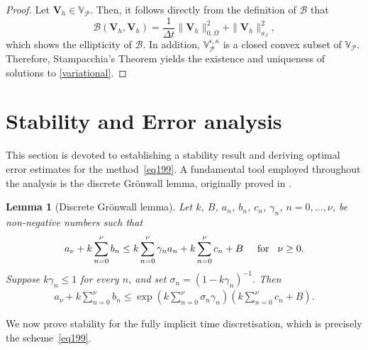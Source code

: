 \documentclass[final,12pt]{amsart}
\theoremstyle{plain}
\newtheorem{lemma}[theorem]{Lemma}
\theoremstyle{definition}
\newcommand\calP{{\mathcal{P}}}
\begin{document}
\begin{proof}
	Let $\mathbf{V}_h\in\mathbb{V}_\calP^{}$. Then, it follows directly from the definition
	of $\mathcal{B}$ that
	\[
	\mathcal{B}(\mathbf{V}_h,\mathbf{V}_h)=\frac{1}{\Delta t}  \|\mathbf{V}_h\|_{0,\Omega}^2
	+\|\mathbf{V}_h\|^2_{a_J} ,
	\] 
	which shows the ellipticity of $\mathcal{B}$.  In addition,  $\mathbb{V}_{\calP}^{\epsilon,\kappa}$ is a closed convex subset of $\mathbb{V}_{\calP}$. Therefore, Stampacchia’s Theorem 
	yields the existence and uniqueness of solutions to \eqref{variational}.
\end{proof}

\section{Stability and Error analysis}\label{Sec:Error}

This section is devoted to establishing a stability result and deriving optimal error estimates for the method~\eqref{eq199}. A fundamental tool employed throughout the analysis is the discrete Gr\"onwall lemma, originally proved in \cite[Lemma~5.1]{heywood1990finite}.

\begin{lemma}[Discrete Gr\"onwall lemma]\label{13}
	Let $k$, $B$, $a_{n}$, $b_{n}$, $c_{n}$, $\gamma_{n}$, $n=0,\ldots,\nu$, be non-negative numbers such that
	\begin{align*}
		a_{\nu}+k\sum_{n=0}^{\nu}b_{n}\leq k\sum_{n=0}^{\nu}\gamma_{n}a_{n}+k\sum_{n=0}^{\nu}c_{n}+B
		\hspace{0.5cm}{\rm for}\hspace{0.3cm}\nu\geq 0.
	\end{align*}
	Suppose $k\gamma_{n}\leq 1$ for every $n$, and set $\sigma_{n}=(1-k\gamma_{n})^{-1}$. Then
	\begin{align}
		a_{\nu}+k\sum_{n=0}^{\nu}b_{n}\leq \exp\left(k\sum_{n=0}^{\nu}\sigma_{n}\gamma_{n}\right)\left(k\sum_{n=0}^{\nu}c_{n}+B\right).\label{inequality11}
	\end{align}
\end{lemma}

We now prove stability for the fully implicit time discretisation,  
which is precisely the scheme~\eqref{eq199}.  
\end{document}
